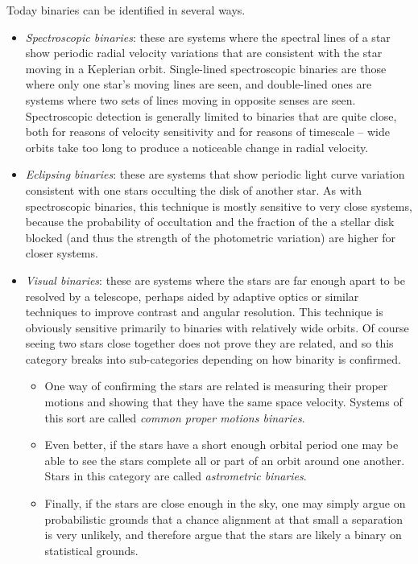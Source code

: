 Today binaries can be identified in several ways.
\begin{itemize}
\item {\it Spectroscopic binaries}: these are systems where the spectral lines of a star show periodic radial velocity variations that are consistent with the star moving in a Keplerian orbit. Single-lined spectroscopic binaries are those where only one star's moving lines are seen, and double-lined ones are systems where two sets of lines moving in opposite senses are seen. Spectroscopic detection is generally limited to binaries that are quite close, both for reasons of velocity sensitivity and for reasons of timescale -- wide orbits take too long to produce a noticeable change in radial velocity.
\item {\it Eclipsing binaries}: these are systems that show periodic light curve variation consistent with one stars occulting the disk of another star. As with spectroscopic binaries, this technique is mostly sensitive to very close systems, because the probability of occultation and the fraction of the a stellar disk blocked (and thus the strength of the photometric variation) are higher for closer systems.
\item {\it Visual binaries}: these are systems where the stars are far enough apart to be resolved by a telescope, perhaps aided by adaptive optics or similar techniques to improve contrast and angular resolution. This technique is obviously sensitive primarily to binaries with relatively wide orbits. Of course seeing two stars close together does not prove they are related, and so this category breaks into sub-categories depending on how binarity is confirmed. 
\begin{itemize}
\item One way of confirming the stars are related is measuring their proper motions and showing that they have the same space velocity. Systems of this sort are called {\it common proper motions binaries}. 
\item Even better, if the stars have a short enough orbital period one may be able to see the stars complete all or part of an orbit around one another. Stars in this category are called {\it astrometric binaries}.
\item Finally, if the stars are close enough in the sky, one may simply argue on probabilistic grounds that a chance alignment at that small a separation is very unlikely, and therefore argue that the stars are likely a binary on statistical grounds.
\end{itemize}
\end{itemize}

